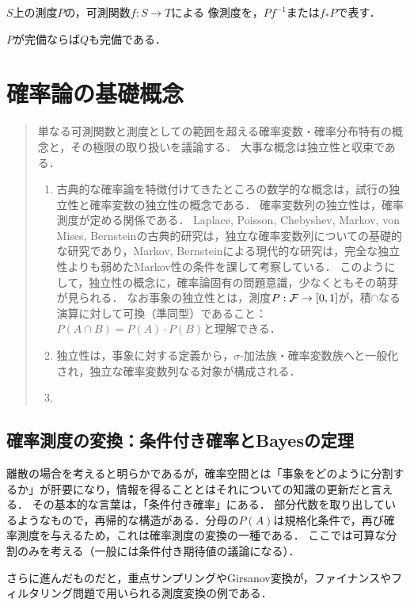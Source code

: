 \documentclass[uplatex,dvipdfmx]{jsreport}
\begin{document}
\begin{definition}
    $S$上の測度$P$の，可測関数$f:S\to T$による
    像測度を，$Pf^{-1}$または$f_*P$で表す．
\end{definition}

\begin{lemma}
    $P$が完備ならば$Q$も完備である．
\end{lemma}

\chapter{確率論の基礎概念}

\begin{quotation}
    単なる可測関数と測度としての範囲を超える確率変数・確率分布特有の概念と，その極限の取り扱いを議論する．
    大事な概念は独立性と収束である．
    \begin{enumerate}
        \item 古典的な確率論を特徴付けてきたところの数学的な概念は，試行の独立性と確率変数の独立性の概念である．
        確率変数列の独立性は，確率測度が定める関係である．
        Laplace, Poisson, Chebyshev, Markov, von Mises, Bernsteinの古典的研究は，独立な確率変数列についての基礎的な研究であり，Markov, Bernsteinによる現代的な研究は，完全な独立性よりも弱めたMarkov性の条件を課して考察している．
        このようにして，独立性の概念に，確率論固有の問題意識，少なくともその萌芽が見られる\cite{Kolmogorov}．
        なお事象の独立性とは，測度$P:\mathcal{F}\to[0,1]$が，積$\cap$なる演算に対して可換（準同型）であること：$P(A\cap B)=P(A)\cdot P(B)$と理解できる．
        \item 独立性は，事象に対する定義から，$\sigma$-加法族・確率変数族へと一般化され，独立な確率変数列なる対象が構成される．
        \item 
    \end{enumerate}
\end{quotation}

\section{確率測度の変換：条件付き確率とBayesの定理}

\begin{tcolorbox}[colframe=ForestGreen, colback=ForestGreen!10!white,breakable,colbacktitle=ForestGreen!40!white,coltitle=black,fonttitle=\bfseries\sffamily,
title=確率空間の万華鏡による拡大]
    離散の場合を考えると明らかであるが，確率空間とは「事象をどのように分割するか」が肝要になり，情報を得ることとはそれについての知識の更新だと言える．
    その基本的な言葉は，「条件付き確率」にある．
    部分代数を取り出しているようなもので，再帰的な構造がある．分母の$P(A)$は規格化条件で，再び確率測度を与えるため，これは確率測度の変換の一種である．
    ここでは可算な分割のみを考える（一般には条件付き期待値の議論になる）．

    さらに進んだものだと，重点サンプリングやGirsanov変換が，ファイナンスやフィルタリング問題で用いられる測度変換の例である．
\end{tcolorbox}
\end{document}
